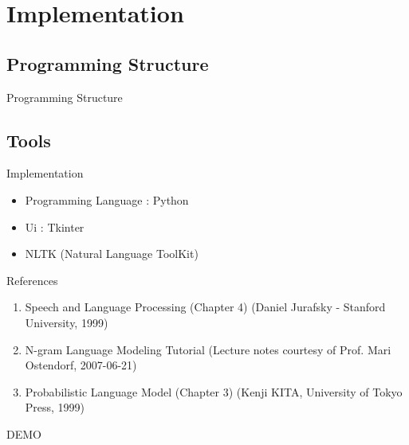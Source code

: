 \documentclass{beamer}
\begin{document}
\section{Implementation}
\subsection{Programming Structure}
\begin{frame}{Programming Structure}
    \smartdiagramset{}
    \begin{center}
    \end{center}
\end{frame}

\subsection{Tools}
\begin{frame}{Implementation}
    \begin{itemize}
        \item Programming Language : Python
        \item Ui : Tkinter
        \item NLTK (Natural Language ToolKit)
    \end{itemize}
\end{frame}


\begin{frame}{References}
    \begin{enumerate}
        \item Speech and Language Processing (Chapter 4) (Daniel Jurafsky - Stanford University, 1999)
        \item N-gram Language Modeling Tutorial (Lecture notes courtesy of Prof. Mari Ostendorf, 2007-06-21)
        \item Probabilistic Language Model (Chapter 3) (Kenji KITA, University of Tokyo Press, 1999)
    \end{enumerate}
\end{frame}
\begin{frame}
    \centering
    \Huge DEMO
\end{frame}

\end{document}

